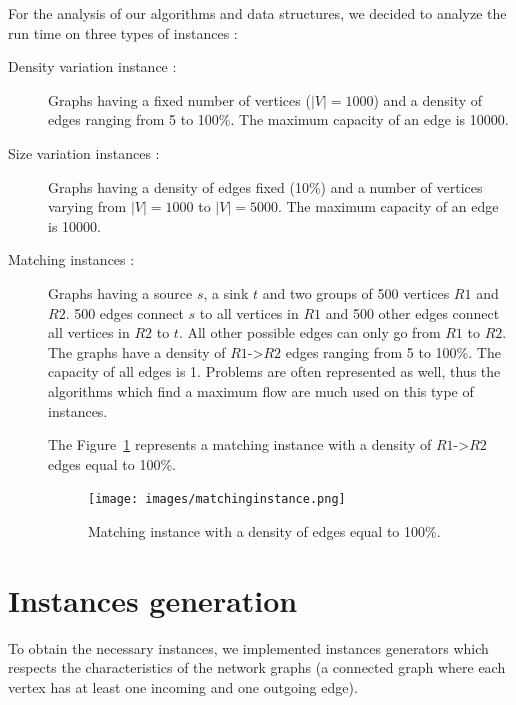 
For the analysis of our algorithms and data structures, we decided to analyze the run time on three types of instances :
\begin{description}
\item[Density variation instance :]{Graphs having a fixed number of vertices ($|V|=1000$) and a density of edges ranging from 5 to 100\%. The maximum capacity of an edge is 10000.}
\item[Size variation instances :]{Graphs having a density of edges fixed (10\%) and a number of vertices varying from $|V|=1000$ to $|V|=5000$. The maximum capacity of an edge is 10000.}
\item[Matching instances :]{Graphs having a source $s$, a sink $t$ and two groups of 500 vertices $R1$ and $R2$. 500 edges connect $s$ to all vertices in $R1$ and 500 other edges connect all vertices in $R2$ to $t$. All other possible edges can only go from $R1$ to $R2$. The graphs have a density of $R1$->$R2$ edges ranging from 5 to 100\%. The capacity of all edges is 1.
Problems are often represented as well, thus the algorithms which find a maximum flow are much used on this type of instances.

The Figure~\ref{fig:matching} represents a matching instance with a density of $R1$->$R2$ edges equal to 100\%.

\begin{figure}[H]
\begin{center}
\texttt{[image: images/matchinginstance.png]}
\caption{Matching instance with a density of edges equal to 100\%.}
\label{fig:matching}
\end{center}
\end{figure}}
\end{description} 

\section{Instances generation}
To obtain the necessary instances, we implemented instances generators which respects the characteristics of the network graphs (a connected graph where each vertex has at least one incoming and one outgoing edge).

